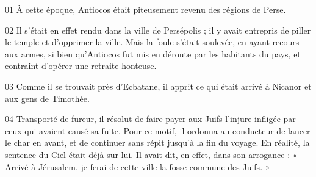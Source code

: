 01 À cette époque, Antiocos était piteusement revenu des régions de Perse.

02 Il s’était en effet rendu dans la ville de Persépolis ; il y avait entrepris de piller le temple et d’opprimer la ville. Mais la foule s’était soulevée, en ayant recours aux armes, si bien qu’Antiocos fut mis en déroute par les habitants du pays, et contraint d’opérer une retraite honteuse.

03 Comme il se trouvait près d’Ecbatane, il apprit ce qui était arrivé à Nicanor et aux gens de Timothée.

04 Transporté de fureur, il résolut de faire payer aux Juifs l’injure infligée par ceux qui avaient causé sa fuite. Pour ce motif, il ordonna au conducteur de lancer le char en avant, et de continuer sans répit jusqu’à la fin du voyage. En réalité, la sentence du Ciel était déjà sur lui. Il avait dit, en effet, dans son arrogance : « Arrivé à Jérusalem, je ferai de cette ville la fosse commune des Juifs. »
